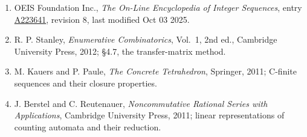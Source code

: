 \documentclass[11pt]{article}
\theoremstyle{definition}
\begin{document}
\begin{enumerate}

\item OEIS Foundation Inc., \emph{The On-Line Encyclopedia of Integer Sequences}, entry \href{https://oeis.org/A223641}{A223641}, revision 8, last modified Oct 03 2025.

\item R. P. Stanley, \emph{Enumerative Combinatorics}, Vol.~1, 2nd ed., Cambridge University Press, 2012; \S4.7, the transfer-matrix method.

\item M. Kauers and P. Paule, \emph{The Concrete Tetrahedron}, Springer, 2011; C-finite sequences and their closure properties.

\item J. Berstel and C. Reutenauer, \emph{Noncommutative Rational Series with Applications}, Cambridge University Press, 2011; linear representations of counting automata and their reduction.

\end{enumerate}
\end{document}
